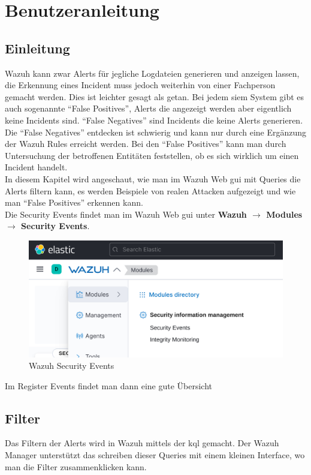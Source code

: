 \chapter{Benutzeranleitung}
\section{Einleitung}
Wazuh kann zwar Alerts für jegliche Logdateien generieren und anzeigen lassen, die Erkennung eines Incident muss jedoch weiterhin von einer Fachperson gemacht werden.
Dies ist leichter gesagt als getan.
Bei jedem \acrshort{siem} System gibt es auch sogenannte ``False Positives'', Alerts die angezeigt werden aber eigentlich keine Incidents sind. ``False Negatives'' sind Incidents die keine Alerts generieren.
Die ``False Negatives'' entdecken ist schwierig und kann nur durch eine Ergänzung der Wazuh Rules erreicht werden.
Bei den ``False Positives'' kann man durch Untersuchung der betroffenen Entitäten feststellen, ob es sich wirklich um einen Incident handelt.\\

In diesem Kapitel wird angeschaut, wie man im Wazuh Web \acrshort{gui} mit Queries die Alerts filtern kann, es werden Beispiele von realen Attacken aufgezeigt und wie man ``False Positives'' erkennen kann.\\

Die Security Events findet man im Wazuh Web \acrshort{gui} unter \textbf{Wazuh $\rightarrow$ Modules $\rightarrow$ Security Events}.
\begin{figure}[H]
    \centering
    \includegraphics[width=\linewidth]{../img/wazuh-security-events.png}
    \caption{Wazuh Security Events}
\end{figure}
Im Register Events findet man dann eine gute Übersicht
\section{Filter}
Das Filtern der Alerts wird in Wazuh mittels der \acrfull{kql} gemacht.
Der Wazuh Manager unterstützt das schreiben dieser Queries mit einem kleinen Interface, wo man die Filter zusammenklicken kann.\\

